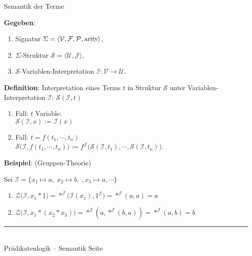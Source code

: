 \documentclass{slides}
\newcommand{\myrule}{\rule{20cm}{1mm}\\ }
\newcommand{\struct}{\mathcal{S}}
\newcounter{mypage}
\begin{document}
\begin{slide}{}
\normalsize
\begin{center}
Semantik der Terme
\end{center}
\vspace{0.5cm}

\footnotesize

\textbf{Gegeben}: 
\begin{enumerate}
\item Signatur $\Sigma = \langle \mathcal{V}, \mathcal{F}, \mathcal{P}, \textsl{arity} \rangle$,
\item $\Sigma$-Struktur $\struct = \langle \mathcal{U}, \mathcal{J} \rangle$,
\item $\struct$-Variablen-Interpretation $\mathcal{I}: \mathcal{V} \rightarrow \mathcal{U}$.
\end{enumerate}

\textbf{Definition}: Interpretation eines Terms $t$ in Struktur $\mathcal{S}$ unter
Variablen-Interpretation $\mathcal{I}$:  $\struct(\mathcal{I}, t)$
\begin{enumerate}
\item Fall: $t$ Variable: \\[0.3cm]
      \hspace*{1.3cm} $\struct(\mathcal{I}, x) := \mathcal{I}(x)$
\item Fall: $t = f(t_1,\cdots,t_n)$  \\[0.3cm]
      \hspace*{1.3cm} $\struct\Bigg(\mathcal{I}, f(t_1,\cdots,t_n)\Bigg) := 
                       f^\mathcal{J}\Bigg( \struct(\mathcal{I}, t_1), \cdots, \struct(\mathcal{I}, t_n) \Bigg)$.
\end{enumerate}

\textbf{Beispiel}: (Gruppen-Theorie) 

Sei $\mathcal{I} = \{ x_1 \mapsto a, \; x_2 \mapsto b, \;, x_3 \mapsto a, \cdots \}$ 
\begin{enumerate}
\item $\mathcal{Z}\Bigg(\mathcal{I}, x_1 * 1\Bigg) = *^\mathcal{J}\Bigg(\mathcal{I}(x_1), 1^\mathcal{J}\Bigg) = *^\mathcal{J}(a, a) = a$
\item $\mathcal{Z}\Bigg(\mathcal{I}, x_1 * (x_2 * x_3)\Bigg) = *^\mathcal{J}(a, *^\mathcal{J}(b,a)) = *^\mathcal{J}(a, b) = b$
\end{enumerate}

\vspace*{\fill}
\tiny \addtocounter{mypage}{1}
\myrule
Prädikatenlogik -- Semantik  \hspace*{\fill} Seite 
\end{slide}
\end{document}
